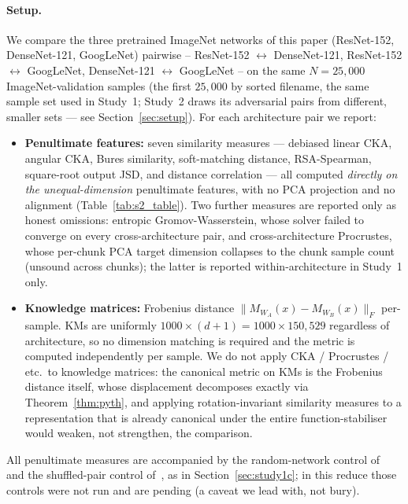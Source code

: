 \paragraph{Setup.}
We compare the three pretrained ImageNet networks of this paper
(ResNet-152, DenseNet-121, GoogLeNet) pairwise -- ResNet-152
$\leftrightarrow$ DenseNet-121, ResNet-152 $\leftrightarrow$ GoogLeNet,
DenseNet-121 $\leftrightarrow$ GoogLeNet -- on the same
$N = 25{,}000$ ImageNet-validation samples (the first $25{,}000$ by sorted
filename, the same sample set used in Study~1; Study~2 draws its adversarial
pairs from different, smaller sets --- see Section~\ref{sec:setup}).
For each architecture pair we report:
\begin{itemize}
\item \textbf{Penultimate features:} seven similarity measures ---
  debiased linear CKA, angular CKA, Bures similarity, soft-matching
  distance, RSA-Spearman, square-root output JSD, and distance correlation
  --- all computed \emph{directly on the unequal-dimension} penultimate
  features, with no PCA projection and no alignment
  (Table~\ref{tab:s2_table}). Two further measures are reported only as
  honest omissions: entropic Gromov-Wasserstein, whose solver failed to
  converge on every cross-architecture pair, and cross-architecture
  Procrustes, whose per-chunk PCA target dimension collapses to the chunk
  sample count (unsound across chunks); the latter is reported
  within-architecture in Study~1 only.
\item \textbf{Knowledge matrices:} Frobenius distance
  $\|M_{W_A}(x) - M_{W_B}(x)\|_F$ per-sample. KMs are uniformly
  $1000 \times (d{+}1) = 1000 \times 150{,}529$ regardless of
  architecture, so no dimension matching is required and the metric
  is computed independently per sample. We do not apply CKA / Procrustes /
  etc.\ to knowledge matrices: the canonical metric on KMs is the
  Frobenius distance itself, whose displacement decomposes exactly via
  Theorem~\ref{thm:pyth}, and applying rotation-invariant similarity
  measures to a representation that is already canonical under the
  entire function-stabiliser would weaken, not strengthen, the
  comparison.
\end{itemize}
All penultimate measures are accompanied by the random-network control
of~\citet{cui2022deconfounded} and the shuffled-pair control
of~\citet{murphy2024debiased}, as in Section~\ref{sec:study1c}; in this
reduce those controls were not run and are pending (a caveat we lead with,
not bury).

